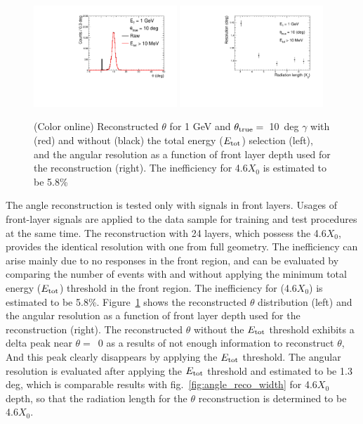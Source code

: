 \documentclass[jkps,preprint,fleqn,showpacs,showkeys]{revtex4}
\begin{document}
\begin{figure}[!hbt]
\includegraphics[width=0.48\textwidth]{figures/Fig3_reco_layer_hist.pdf}
\includegraphics[width=0.48\textwidth]{figures/Fig3_reco_layer_graph.pdf}
\caption{ (Color online) Reconstructed $\theta$ for 1 GeV and $\theta_{\rm{true}}=$~10~deg $\gamma$ with (red) and without (black) the total energy ($E_{\rm{tot}}$) selection (left), and the angular resolution as a function of front layer depth used for the reconstruction (right). The inefficiency for 4.6$X_{0}$ is estimated to be 5.8\%  }
\label{fig:angle_reco_layer}
\end{figure}

The angle reconstruction is tested only with signals in front layers. Usages of front-layer signals are applied to the data sample for training and test procedures at the same time. The reconstruction with 24 layers, which possess the 4.6$X_{0}$, provides the identical resolution with one from full geometry. The inefficiency can arise mainly due to no responses in the front region, and can be evaluated by comparing the number of events with and without applying the minimum total energy ($E_{\rm{tot}}$) threshold in the front region. The inefficiency for (4.6$X_{0}$) is estimated to be 5.8\%. Figure~\ref{fig:angle_reco_layer} shows the reconstructed $\theta$ distribution (left) and the angular resolution as a function of front layer depth used for the reconstruction (right). The reconstructed $\theta$ without the $E_{\rm{tot}}$ threshold exhibits a delta peak near $\theta=$~0 as a results of not enough information to reconstruct $\theta$, And this peak clearly disappears by applying the $E_{\rm{tot}}$ threshold. The angular resolution is evaluated after applying the $E_{\rm{tot}}$ threshold and estimated to be 1.3 deg, which is comparable results with fig.~\ref{fig:angle_reco_width} for 4.6$X_{0}$ depth, so that the radiation length for the $\theta$ reconstruction is determined to be 4.6$X_{0}$.
\end{document}
